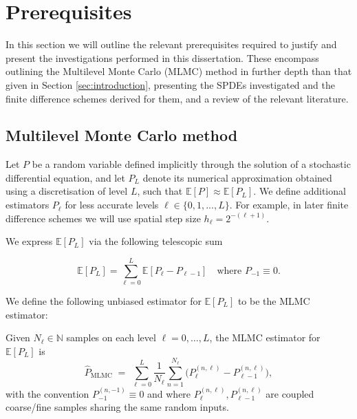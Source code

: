 \section{Prerequisites}

In this section we will outline the relevant prerequisites required to 
justify and present the investigations performed in this dissertation. 
These encompass outlining the Multilevel Monte Carlo (MLMC)
method in further depth than that given in Section \ref{sec:introduction}, 
presenting the SPDEs investigated and the finite difference schemes derived for them,
and a review of the relevant literature.
\cite{giles2015multilevel}

\subsection{Multilevel Monte Carlo method}

Let $P$ be a random variable defined implicitly through the solution of a stochastic
differential equation, and let $P_L$ denote its numerical approximation 
obtained using a discretisation of level $L$, such that 
$\mathbb{E}[P] \approx \mathbb{E}[P_L]$. We define additional estimators $P_\ell$ 
for less accurate levels $\ell \in \{0, 1, ..., L\}$.
For example, in later  
finite difference schemes we will use spatial step size $h_\ell = 2^{-(\ell+1)}$.

We express $\mathbb{E}[P_L]$ via the following telescopic sum

\begin{equation*}
    \mathbb{E}[P_L] = \sum_{\ell = 0}^L \mathbb{E}\left[P_\ell - P_{\ell - 1}\right] 
    \quad \text{where } P_{-1} \equiv 0.
\end{equation*}

We define the following unbiased estimator for $\mathbb{E}[P_L]$ to be the MLMC estimator:

\begin{definition}\label{def:mlmc_estimator}
    Given $N_\ell \in \mathbb{N}$ samples on each level $\ell = 0, \dots, L$, the 
    MLMC estimator for $\mathbb{E}[P_L]$ is
    \[
    \hat{P}_{\mathrm{MLMC}} 
    \;=\; \sum_{\ell=0}^L 
    \frac{1}{N_\ell} \sum_{n=1}^{N_\ell}
    \big( P_\ell^{(n,\ell)} - P_{\ell-1}^{(n,\ell)} \big),
    \]
    with the convention $P_{-1}^{(n, -1)} \equiv 0$ and where $P_\ell^{(n, \ell)},
    P_{\ell - 1}^{(n, \ell)}$ are coupled coarse/fine samples sharing the same random inputs.
\end{definition}

